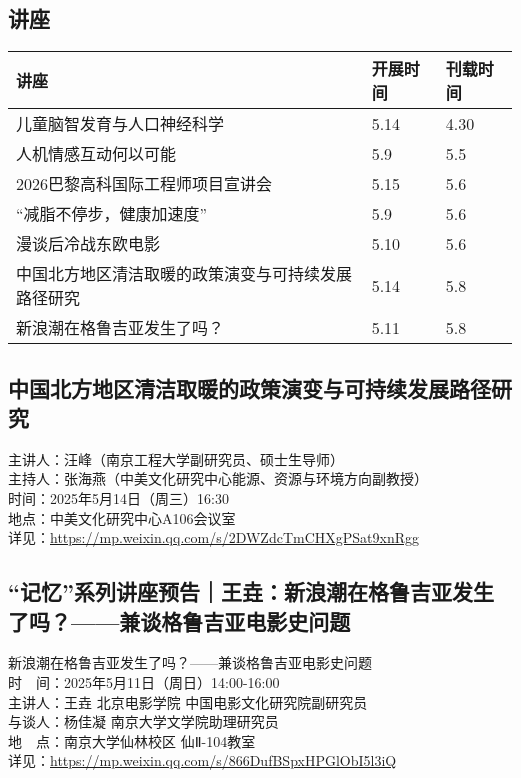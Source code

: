 \documentclass[letterpaper, 12pt]{article}
\begin{document}
\begin{multicols}{2}
\pagebreak

\section{讲座}
\begin{tabular}{|>{\centering\arraybackslash}m{}|m{}|m{}|}
    \hline
    讲座 & 开展时间 & 刊载时间\\
    \hline\hline
    儿童脑智发育与人口神经科学 & 5.14 & 4.30\\\hline
    人机情感互动何以可能 & 5.9 & 5.5\\\hline
    2026巴黎高科国际工程师项目宣讲会 & 5.15 & 5.6\\\hline
    “减脂不停步，健康加速度” & 5.9 & 5.6\\\hline
    漫谈后冷战东欧电影 & 5.10 & 5.6\\\hline
    中国北方地区清洁取暖的政策演变与可持续发展路径研究 & 5.14 & 5.8\\\hline
    新浪潮在格鲁吉亚发生了吗？ & 5.11 & 5.8\\\hline
    
\end{tabular}
\subsection{中国北方地区清洁取暖的政策演变与可持续发展路径研究} %
主讲人：汪峰（南京工程大学副研究员、硕士生导师）
\\主持人：张海燕（中美文化研究中心能源、资源与环境方向副教授）
\\时间：2025年5月14日（周三）16:30
\\地点：中美文化研究中心A106会议室
\\详见：\url{https://mp.weixin.qq.com/s/2DWZdcTmCHXgPSat9xnRgg}

\subsection{“记忆”系列讲座预告｜王垚：新浪潮在格鲁吉亚发生了吗？——兼谈格鲁吉亚电影史问题} %
新浪潮在格鲁吉亚发生了吗？——兼谈格鲁吉亚电影史问题
\\时　间：2025年5月11日（周日）14:00-16:00
\\主讲人：王垚 北京电影学院 中国电影文化研究院副研究员
\\与谈人：杨佳凝 南京大学文学院助理研究员
\\地　点：南京大学仙林校区 仙Ⅱ-104教室
\\详见：\url{https://mp.weixin.qq.com/s/866DufBSpxHPGlObI5l3iQ}

\end{multicols}
\end{document}
